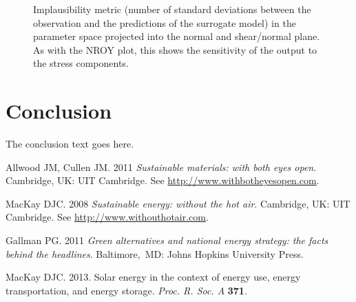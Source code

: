 \documentclass[openacc]{rstransa}%
\begin{document}
\begin{figure}[!h]
\caption{Implausibility metric (number of standard deviations between the observation and the predictions of the surrogate model) in the parameter space projected into the normal and shear/normal plane. As with the NROY plot, this shows the sensitivity of the output to the stress components.}
\label{fig_implausibility}
\end{figure}



\section{Conclusion}
The conclusion text goes here.\vskip6pt

\enlargethispage{20pt}










\begin{thebibliography}{9}

 Allwood JM, Cullen JM. 2011 \textit{Sustainable materials:  with both eyes open}.
Cambridge, UK: UIT Cambridge. See \href{http://www.withbotheyesopen.com}{http://www.withbotheyesopen.com}.

  MacKay DJC. 2008  \textit{Sustainable energy:  without the hot air}.
 Cambridge, UK: UIT Cambridge. See \href{http://www.withouthotair.com}{http://www.withouthotair.com}.

 Gallman PG. 2011  \textit{Green alternatives and national energy strategy: the facts
 behind the headlines}.  Baltimore,\ MD: Johns Hopkins University Press.

 MacKay DJC. 2013.  Solar energy in the context of energy use, energy transportation, and
 energy storage. \textit{Proc. R. Soc. A} \textbf{371}.

\end{thebibliography}
\end{document}
